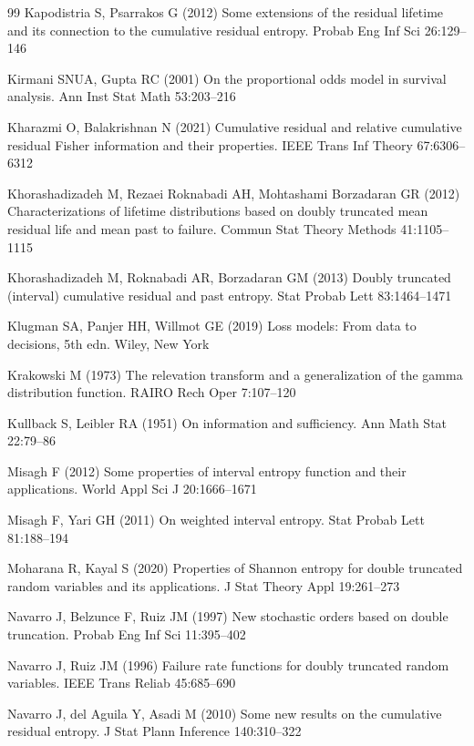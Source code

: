 \documentclass[11pt]{article}
\begin{document}
\begin{thebibliography}{99}
Kapodistria S, Psarrakos G (2012) Some extensions of the residual lifetime and its connection to the cumulative residual entropy. Probab Eng Inf Sci 26:129--146

Kirmani SNUA, Gupta RC (2001) On the proportional odds model in survival analysis. Ann Inst Stat Math 53:203--216

Kharazmi O, Balakrishnan N (2021) Cumulative residual and relative cumulative residual Fisher information and their properties. IEEE Trans Inf Theory 67:6306--6312

Khorashadizadeh M, Rezaei Roknabadi AH, Mohtashami Borzadaran GR (2012) Characterizations of lifetime distributions based on doubly truncated mean residual life and mean past to failure. Commun Stat Theory Methods 41:1105--1115

Khorashadizadeh M, Roknabadi AR, Borzadaran GM (2013) Doubly truncated (interval) cumulative residual and past entropy. Stat Probab Lett 83:1464--1471

Klugman SA, Panjer HH, Willmot GE (2019) Loss models: From data to decisions, 5th edn. Wiley, New York

Krakowski M (1973) The relevation transform and a generalization of the gamma distribution function. RAIRO Rech Oper 7:107--120

Kullback S, Leibler RA (1951) On information and sufficiency. Ann Math Stat 22:79--86

Misagh F (2012) Some properties of interval entropy function and their applications. World Appl Sci J 20:1666--1671

Misagh F, Yari GH (2011) On weighted interval entropy. Stat Probab Lett 81:188--194

Moharana R, Kayal S (2020) Properties of Shannon entropy for double truncated random variables and its applications. J Stat Theory Appl 19:261--273

Navarro J, Belzunce F, Ruiz JM (1997) New stochastic orders based on double truncation. Probab Eng Inf Sci 11:395--402

Navarro J, Ruiz JM (1996) Failure rate functions for doubly truncated random variables. IEEE Trans Reliab 45:685--690

Navarro J, del Aguila Y, Asadi M (2010) Some new results on the cumulative residual entropy. J Stat Plann Inference 140:310--322


\end{thebibliography}
\end{document}
